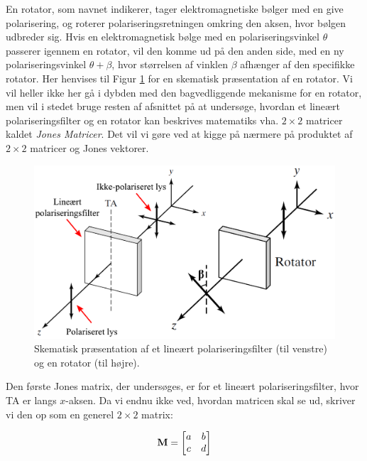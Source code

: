 En rotator, som navnet indikerer, tager elektromagnetiske bølger med en give polarisering, og roterer polariseringsretningen omkring den aksen, hvor bølgen udbreder sig. Hvis en elektromagnetisk bølge med en polariseringsvinkel $\theta$ passerer igennem en rotator, vil den komme ud på den anden side, med en ny polariseringsvinkel $\theta + \beta$, hvor størrelsen af vinklen $\beta$ afhænger af den specifikke rotator. Her henvises til Figur \ref{to_pol_filt} for en skematisk præsentation af en rotator. Vi vil heller ikke her gå i dybden med den bagvedliggende mekanisme for en rotator, men vil i stedet bruge resten af afsnittet på at undersøge, hvordan et lineært polariseringsfilter og en rotator kan beskrives matematiks vha. $2 \times 2$ matricer kaldet \emph{Jones Matricer}. Det vil vi gøre ved at kigge på nærmere på produktet af $2 \times 2$ matricer og Jones vektorer.\\

\begin{figure}[h!]
	\centering
	\includegraphics[scale=0.43]{Elektrodynamik/to_pol_filt.pdf}
	\caption{Skematisk præsentation af et lineært polariseringsfilter (til venstre) og en rotator (til højre).}
	\label{to_pol_filt}
\end{figure}

Den første Jones matrix, der undersøges, er for et lineært polariseringsfilter, hvor TA er langs $x$-aksen. Da vi endnu ikke ved, hvordan matricen skal se ud, skriver vi den op som en generel $2 \times 2$ matrix:

$$\mathbf{M} =  \begin{bmatrix}
a & b \\ 
c & d \\
\end{bmatrix}$$ 

\vspace{2mm}

